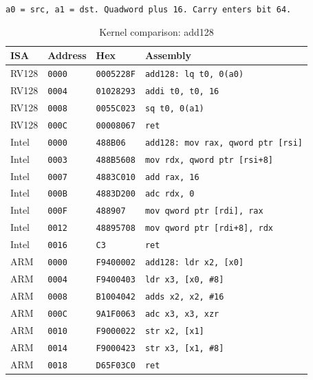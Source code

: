 \begin{table}[htbp]
\centering
\caption{Kernel comparison: add128}
\begingroup
\scriptsize
\setlength{\tabcolsep}{4pt}
\noindent \texttt{a0 = src, a1 = dst. Quadword plus 16. Carry enters bit 64.}\par
\vspace{0.6ex}
\begin{tabular}{@{}l|l|l|p{7.2cm}@{}}
\toprule
ISA & Address & Hex & Assembly \\
\midrule
RV128 & \texttt{0000} & \texttt{0005228F} & \texttt{add128: lq t0, 0(a0)} \\
RV128 & \texttt{0004} & \texttt{01028293} & \texttt{addi t0, t0, 16} \\
RV128 & \texttt{0008} & \texttt{0055C023} & \texttt{sq t0, 0(a1)} \\
RV128 & \texttt{000C} & \texttt{00008067} & \texttt{ret} \\
\midrule
Intel & \texttt{0000} & \texttt{488B06} & \texttt{add128: mov rax, qword ptr [rsi]} \\
Intel & \texttt{0003} & \texttt{488B5608} & \texttt{mov rdx, qword ptr [rsi+8]} \\
Intel & \texttt{0007} & \texttt{4883C010} & \texttt{add rax, 16} \\
Intel & \texttt{000B} & \texttt{4883D200} & \texttt{adc rdx, 0} \\
Intel & \texttt{000F} & \texttt{488907} & \texttt{mov qword ptr [rdi], rax} \\
Intel & \texttt{0012} & \texttt{48895708} & \texttt{mov qword ptr [rdi+8], rdx} \\
Intel & \texttt{0016} & \texttt{C3} & \texttt{ret} \\
\midrule
ARM & \texttt{0000} & \texttt{F9400002} & \texttt{add128: ldr x2, [x0]} \\
ARM & \texttt{0004} & \texttt{F9400403} & \texttt{ldr x3, [x0, \#8]} \\
ARM & \texttt{0008} & \texttt{B1004042} & \texttt{adds x2, x2, \#16} \\
ARM & \texttt{000C} & \texttt{9A1F0063} & \texttt{adc x3, x3, xzr} \\
ARM & \texttt{0010} & \texttt{F9000022} & \texttt{str x2, [x1]} \\
ARM & \texttt{0014} & \texttt{F9000423} & \texttt{str x3, [x1, \#8]} \\
ARM & \texttt{0018} & \texttt{D65F03C0} & \texttt{ret} \\
\bottomrule
\end{tabular}
\endgroup
\end{table}
\noindent{}\par
